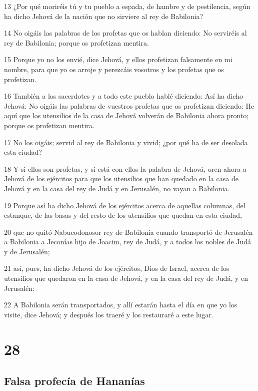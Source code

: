 \par 13 ¿Por qué moriréis tú y tu pueblo a espada, de hambre y de pestilencia, según ha dicho Jehová de la nación que no sirviere al rey de Babilonia?
\par 14 No oigáis las palabras de los profetas que os hablan diciendo: No serviréis al rey de Babilonia; porque os profetizan mentira.
\par 15 Porque yo no los envié, dice Jehová, y ellos profetizan falsamente en mi nombre, para que yo os arroje y perezcáis vosotros y los profetas que os profetizan.
\par 16 También a los sacerdotes y a todo este pueblo hablé diciendo: Así ha dicho Jehová: No oigáis las palabras de vuestros profetas que os profetizan diciendo: He aquí que los utensilios de la casa de Jehová volverán de Babilonia ahora pronto; porque os profetizan mentira.
\par 17 No los oigáis; servid al rey de Babilonia y vivid; ¿por qué ha de ser desolada esta ciudad?
\par 18 Y si ellos son profetas, y si está con ellos la palabra de Jehová, oren ahora a Jehová de los ejércitos para que los utensilios que han quedado en la casa de Jehová y en la casa del rey de Judá y en Jerusalén, no vayan a Babilonia.
\par 19 Porque así ha dicho Jehová de los ejércitos acerca de aquellas columnas, del estanque, de las basas y del resto de los utensilios que quedan en esta ciudad,
\par 20 que no quitó Nabucodonosor rey de Babilonia cuando transportó de Jerusalén a Babilonia a Jeconías hijo de Joacim, rey de Judá, y a todos los nobles de Judá y de Jerusalén;
\par 21 así, pues, ha dicho Jehová de los ejércitos, Dios de Israel, acerca de los utensilios que quedaron en la casa de Jehová, y en la casa del rey de Judá, y en Jerusalén:
\par 22 A Babilonia serán transportados, y allí estarán hasta el día en que yo los visite, dice Jehová; y después los traeré y los restauraré a este lugar. 

\chapter{28}

\section*{Falsa profecía de Hananías}

